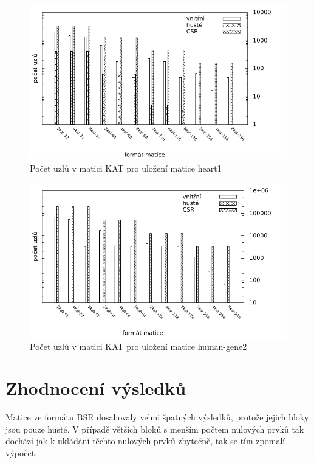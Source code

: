 \begin{figure}[htb]
	\includegraphics[width=1.0\textwidth]{./images/measure1/kat_nodes_heart1}
	\caption{Počet uzlů v matici KAT pro uložení matice heart1}
	\label{fig:mtxsizeheart}
\end{figure}

\begin{figure}[htb]
	\includegraphics[width=1.0\textwidth]{./images/measure1/kat_nodes_human-gene2}
	\caption{Počet uzlů v matici KAT pro uložení matice human-gene2}
	\label{fig:mtxsizehuman}
\end{figure}




\section{Zhodnocení výsledků}

Matice ve formátu BSR dosahovaly velmi špatných výsledků, protože	 jejich bloky jsou pouze husté. V případě větších bloků s menším počtem nulových prvků tak dochází jak k ukládání těchto nulových prvků zbytečně, tak se tím zpomalí výpočet.

